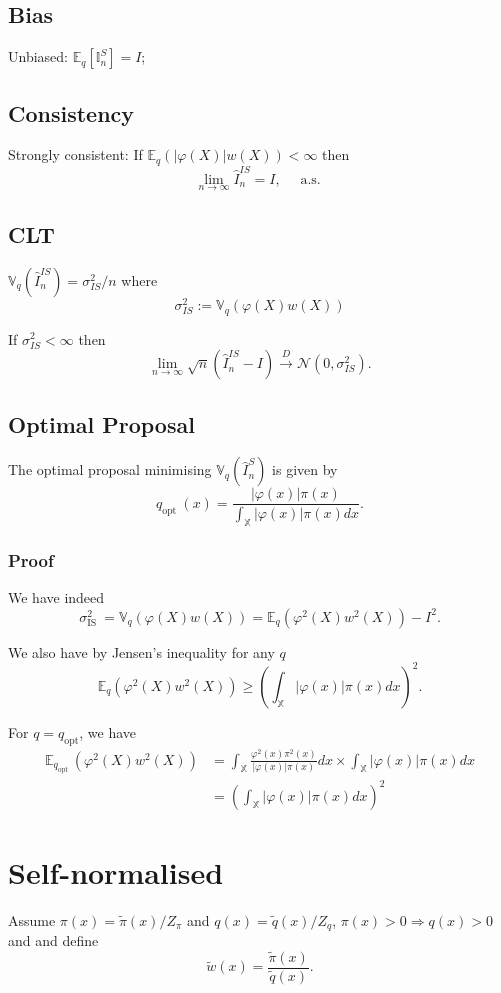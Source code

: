 \documentclass{article}
\begin{document}
\subsection{Bias}
Unbiased: $\mathbb{E}_q\left[\mathbb{I}_n^S\right]=I$;

\subsection{Consistency}
Strongly consistent: If $\mathbb{E}_q(|\varphi(X)| w(X))<\infty$ then
$$
\lim _{n \rightarrow \infty} \widehat{I}_n^{I S}=I, \quad \text { a.s. }
$$

\subsection{CLT}
$\mathbb{V}_q\left(\widehat{I}_n^{IS}\right)=\sigma_{I S}^2 / n$ where
$$
\sigma_{I S}^2:=\mathbb{V}_q(\varphi(X) w(X))
$$

If $\sigma_{I S}^2<\infty$ then
$$
\lim _{n \rightarrow \infty} \sqrt{n}\left(\hat{I}_n^{IS}-I\right) \xrightarrow{D} \mathcal{N}\left(0, \sigma_{I S}^2\right) .
$$

\subsection{Optimal Proposal}
The optimal proposal minimising $\mathbb{V}_q\left(\hat{I}_n^S\right)$ is given by
$$
q_{\text {opt }}(x)=\frac{|\varphi(x)| \pi(x)}{\int_{\mathbb{X}}|\varphi(x)| \pi(x) d x} .
$$
\subsubsection{Proof}
We have indeed
$$
\sigma_{\text {IS }}^2=\mathbb{V}_q(\varphi(X) w(X))=\mathbb{E}_q\left(\varphi^2(X) w^2(X)\right)-I^2 .
$$

We also have by Jensen's inequality for any $q$
$$
\mathbb{E}_q\left(\varphi^2(X) w^2(X)\right) \geq\left(\int_{\mathbb{X}}|\varphi(x)| \pi(x) d x\right)^2 .
$$

For $q=q_{\text {opt}}$, we have
$$
\begin{aligned}
\mathbb{E}_{q_{\text {opt }}}\left(\varphi^2(X) w^2(X)\right) & =\int_{\mathbb{X}} \frac{\varphi^2(x) \pi^2(x)}{|\varphi(x)| \pi(x)} d x \times \int_{\mathbb{X}}|\varphi(x)| \pi(x) d x \\
& =\left(\int_{\mathbb{X}}|\varphi(x)| \pi(x) d x\right)^2
\end{aligned}
$$

\section{Self-normalised}
Assume $\pi(x)=\tilde{\pi}(x) / Z_\pi$ and $q(x)=\tilde{q}(x) / Z_q$, $\pi(x)>0 \Rightarrow q(x)>0$ and and define
$$
\widetilde{w}(x)=\frac{\widetilde{\pi}(x)}{\widetilde{q}(x)} .
$$
\end{document}
